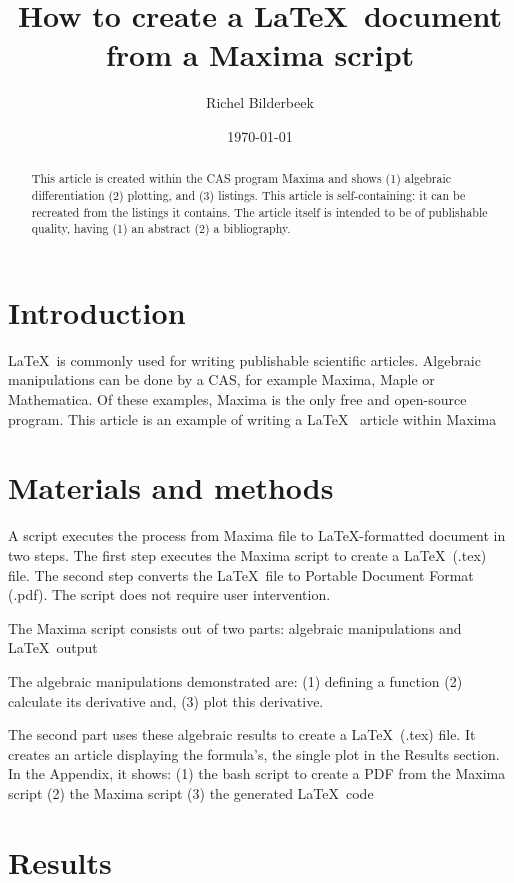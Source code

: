 \documentclass{article}
\title{How to create a \LaTeX~document from a Maxima script}
\author{Richel Bilderbeek}
\date{\today}
\begin{document}
\maketitle

\begin{abstract}
This article is created within the CAS program Maxima
and shows (1) algebraic differentiation (2) plotting, and (3) listings.
This article is self-containing: it can be recreated from the listings it contains.
The article itself is intended to be of
publishable quality, having (1) an abstract (2) a bibliography.
\end{abstract}

\section{Introduction}

\LaTeX~is commonly used for writing publishable scientific articles\cite{gaudeul2006}.
Algebraic manipulations can be done by a CAS, for example Maxima, Maple or Mathematica.
Of these examples, Maxima is the only free and open-source program.
This article is an example of writing a \LaTeX~ article within Maxima

\section{Materials and methods}

A script executes the process from Maxima file to \LaTeX-formatted document in two steps.
The first step executes the Maxima script to create a \LaTeX~(.tex) file.
The second step converts the \LaTeX~file to Portable Document Format (.pdf).
The script does not require user intervention.

The Maxima script consists out of two parts:
algebraic manipulations and \LaTeX~output

The algebraic manipulations demonstrated are: 
(1) defining a function
(2) calculate its derivative and,
(3) plot this derivative.

The second part uses these algebraic results to create a \LaTeX~(.tex) file.
It creates an article displaying the formula's, the single plot in
the Results section.
In the Appendix, it shows: 
(1) the bash script to create a PDF from the Maxima script
(2) the Maxima script
(3) the generated \LaTeX~code

\section{Results}
\end{document}

